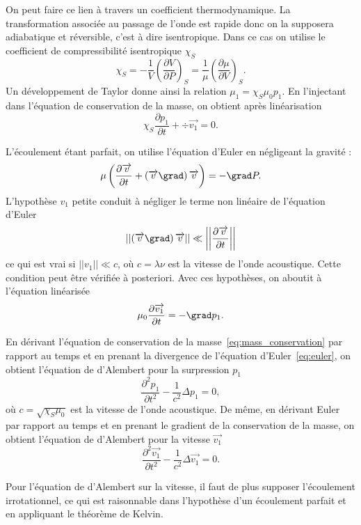 On peut faire ce lien à travers un coefficient thermodynamique.
La transformation associée au passage de l'onde est rapide donc on la supposera adiabatique et réversible, c'est à dire isentropique.
Dans ce cas on utilise le coefficient de compressibilité isentropique $\chi_S$
\begin{equation*}
\chi_S = -\frac{1}{V} \left( \frac{\partial V}{\partial P} \right)_S = \frac{1}{\mu} \left( \frac{\partial \mu}{\partial V} \right)_S.
\end{equation*}
Un développement de Taylor donne ainsi la relation $\mu_1 = \chi_S\mu_0 p_1$.
En l'injectant dans l'équation de conservation de la masse, on obtient après linéarisation
\begin{equation}
\chi_S \frac{\partial p_1}{\partial t} + \div  \overrightarrow{v_1} = 0.
\label{eq:mass_conservation}
\end{equation}

L'écoulement étant parfait, on utilise l'équation d'Euler en négligeant la gravité :
\begin{equation*}
\mu \left( \frac{\partial \overrightarrow{v}}{\partial t} + \left( \overrightarrow{v}\grad\right)\overrightarrow{v}\right) = -\grad P.
\end{equation*}
L'hypothèse $v_1$ petite conduit à négliger le terme non linéaire de l'équation d'Euler
\begin{equation*}
\left|\left|\left( \overrightarrow{v}\grad\right)\overrightarrow{v}\right|\right| \ll \left|\left|\frac{\partial\overrightarrow{v}}{\partial t}\right|\right|
\end{equation*}
ce qui est vrai si $||v_1|| \ll c$, où $c=\lambda\nu$ est la vitesse de l'onde acoustique.
Cette condition peut être vérifiée à posteriori.
Avec ces hypothèses, on aboutit à l'équation linéarisée
\begin{equation}
\mu_0 \frac{\partial \overrightarrow{v_1}}{\partial t} = -\grad p_1.
\label{eq:euler}
\end{equation}

En dérivant l'équation de conservation de la masse~\ref{eq:mass_conservation} par rapport au temps et en prenant la divergence de l'équation d'Euler~\ref{eq:euler}, on obtient l'équation de d'Alembert pour la surpression $p_1$
\begin{equation}
\frac{\partial^2 p_1}{\partial t^2} - \frac{1}{c^2}\Delta p_1 = 0,
\label{eq:dalembert_p}
\end{equation}
où $c=\sqrt{\chi_S \mu_0}$ est la vitesse de l'onde acoustique.
De même, en dérivant Euler par rapport au temps et en prenant le gradient de la conservation de la masse, on obtient l'équation de d'Alembert pour la vitesse $\overrightarrow{v_1}$
\begin{equation}
\frac{\partial^2 \overrightarrow{v_1}}{\partial t^2} - \frac{1}{c^2}\Delta \overrightarrow{v_1} = 0.
\label{eq:dalembert_v}
\end{equation}
\begin{remarque}
Pour l'équation de d'Alembert sur la vitesse, il faut de plus supposer l'écoulement irrotationnel, ce qui est raisonnable dans l'hypothèse d'un écoulement parfait et en appliquant le théorème de Kelvin.
\end{remarque}

